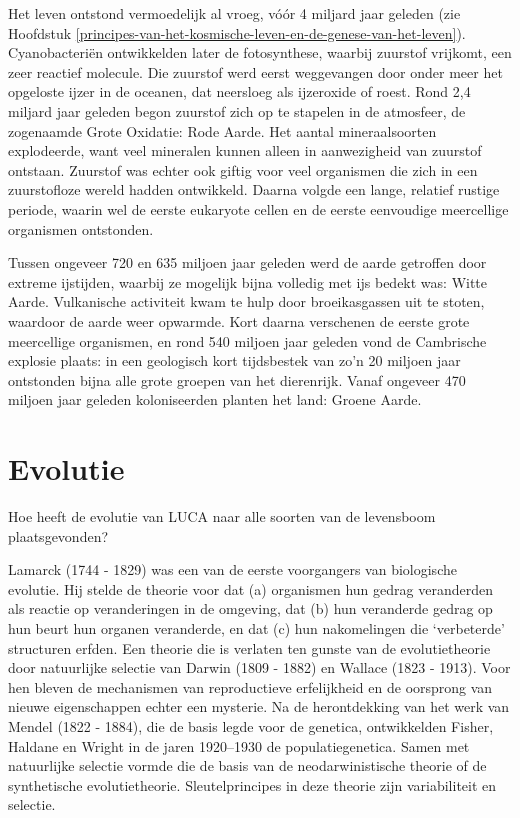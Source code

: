 \documentclass[
  11pt,
]{book}
\begin{document}
Het leven ontstond vermoedelijk al vroeg, vóór 4 miljard jaar geleden (zie Hoofdstuk \ref{principes-van-het-kosmische-leven-en-de-genese-van-het-leven}). Cyanobacteriën ontwikkelden later de fotosynthese, waarbij zuurstof vrijkomt, een zeer reactief molecule. Die zuurstof werd eerst weggevangen door onder meer het opgeloste ijzer in de oceanen, dat neersloeg als ijzeroxide of roest. Rond 2,4 miljard jaar geleden begon zuurstof zich op te stapelen in de atmosfeer, de zogenaamde Grote Oxidatie: Rode Aarde. Het aantal mineraalsoorten explodeerde, want veel mineralen kunnen alleen in aanwezigheid van zuurstof ontstaan. Zuurstof was echter ook giftig voor veel organismen die zich in een zuurstofloze wereld hadden ontwikkeld. Daarna volgde een lange, relatief rustige periode, waarin wel de eerste eukaryote cellen en de eerste eenvoudige meercellige organismen ontstonden.

Tussen ongeveer 720 en 635 miljoen jaar geleden werd de aarde getroffen door extreme ijstijden, waarbij ze mogelijk bijna volledig met ijs bedekt was: Witte Aarde. Vulkanische activiteit kwam te hulp door broeikasgassen uit te stoten, waardoor de aarde weer opwarmde. Kort daarna verschenen de eerste grote meercellige organismen, en rond 540 miljoen jaar geleden vond de Cambrische explosie plaats: in een geologisch kort tijdsbestek van zo'n 20 miljoen jaar ontstonden bijna alle grote groepen van het dierenrijk. Vanaf ongeveer 470 miljoen jaar geleden koloniseerden planten het land: Groene Aarde.

\section{Evolutie}\label{evolutie}

Hoe heeft de evolutie van LUCA naar alle soorten van de levensboom plaatsgevonden?

Lamarck (1744 - 1829) was een van de eerste voorgangers van biologische evolutie. Hij stelde de theorie voor dat (a) organismen hun gedrag veranderden als reactie op veranderingen in de omgeving, dat (b) hun veranderde gedrag op hun beurt hun organen veranderde, en dat (c) hun nakomelingen die `verbeterde' structuren erfden. Een theorie die is verlaten ten gunste van de evolutietheorie door natuurlijke selectie van Darwin (1809 - 1882) en Wallace (1823 - 1913). Voor hen bleven de mechanismen van reproductieve erfelijkheid en de oorsprong van nieuwe eigenschappen echter een mysterie. Na de herontdekking van het werk van Mendel (1822 - 1884), die de basis legde voor de genetica, ontwikkelden Fisher, Haldane en Wright in de jaren 1920--1930 de populatiegenetica. Samen met natuurlijke selectie vormde die de basis van de neodarwinistische theorie of de synthetische evolutietheorie. Sleutelprincipes in deze theorie zijn variabiliteit en selectie.
\end{document}
